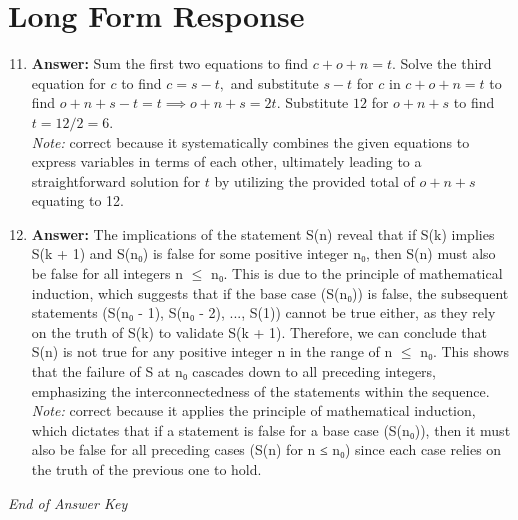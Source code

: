 \documentclass[12pt]{article}
\begin{document}
\section*{Long Form Response}
\begin{enumerate}[label=\arabic*.]
\setcounter{enumi}{10}
\item \textbf{Answer:} Sum the first two equations to find $c+o+n=t.$ Solve the third equation for $c$ to find $c=s-t,$ and substitute $s-t$ for $c$ in $c+o+n=t$ to find $o+n+s-t=t\implies o+n+s=2 t.$ Substitute $12$ for $o+n+s$ to find $t=12/2=\boxed{6}.$
\\ \textit{Note:} correct because it systematically combines the given equations to express variables in terms of each other, ultimately leading to a straightforward solution for \( t \) by utilizing the provided total of \( o + n + s \) equating to 12.
\item \textbf{Answer:} The implications of the statement S(n) reveal that if S(k) implies S(k + 1) and S(n₀) is false for some positive integer n₀, then S(n) must also be false for all integers n \ensuremath{\leq} n₀. This is due to the principle of mathematical induction, which suggests that if the base case (S(n₀)) is false, the subsequent statements (S(n₀ - 1), S(n₀ - 2), ..., S(1)) cannot be true either, as they rely on the truth of S(k) to validate S(k + 1). Therefore, we can conclude that S(n) is not true for any positive integer n in the range of n \ensuremath{\leq} n₀. This shows that the failure of S at n₀ cascades down to all preceding integers, emphasizing the interconnectedness of the statements within the sequence.
\\ \textit{Note:} correct because it applies the principle of mathematical induction, which dictates that if a statement is false for a base case (S(n₀)), then it must also be false for all preceding cases (S(n) for n ≤ n₀) since each case relies on the truth of the previous one to hold.
\end{enumerate}

\vfill
\noindent\textit{End of Answer Key}
\end{document}
